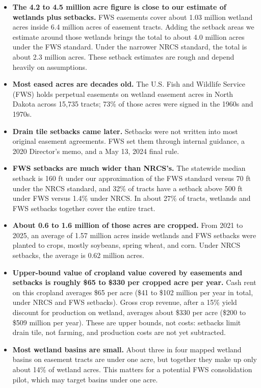 \documentclass{theme/arpc-memo}
\begin{document}
\begin{itemize}

\item {\textbf{\color{ndsu} The 4.2 to 4.5 million acre figure is close to our estimate of wetlands plus setbacks.}} FWS easements cover about 1.03 million wetland acres inside 6.4 million acres of easement tracts. Adding the setback areas we estimate around those wetlands brings the total to about 4.0 million acres under the FWS standard. Under the narrower NRCS standard, the total is about 2.3 million acres. These setback estimates are rough and depend heavily on assumptions.

\item {\textbf{\color{ndsu} Most eased acres are decades old.}} The U.S. Fish and Wildlife Service (FWS) holds perpetual easements on wetland easement acres in North Dakota across 15,735 tracts; 73\% of those acres were signed in the 1960s and 1970s.

\item {\textbf{\color{ndsu} Drain tile setbacks came later.}} Setbacks were not written into most original easement agreements. FWS set them through internal guidance, a 2020 Director's memo, and a May 13, 2024 final rule.

\item {\textbf{\color{ndsu} FWS setbacks are much wider than NRCS's.}} The statewide median setback is 160 ft under our approximation of the FWS standard versus 70 ft under the NRCS standard, and 32\% of tracts have a setback above 500 ft under FWS versus 1.4\% under NRCS. In about 27\% of tracts, wetlands and FWS setbacks together cover the entire tract.

\item {\textbf{\color{ndsu} About 0.6 to 1.6 million of those acres are cropped.}} From 2021 to 2025, an average of 1.57 million acres inside wetlands and FWS setbacks were planted to crops, mostly soybeans, spring wheat, and corn. Under NRCS setbacks, the average is 0.62 million acres.

\item {\textbf{\color{ndsu} Upper-bound value of cropland value covered by easements and setbacks is roughly \$65 to \$330 per cropped acre per year.}} Cash rent on this cropland averages \$65 per acre (\$41 to \$102 million per year in total, under NRCS and FWS setbacks). Gross crop revenue, after a 15\% yield discount for production on wetland, averages about \$330 per acre (\$200 to \$509 million per year). These are upper bounds, not costs: setbacks limit drain tile, not farming, and production costs are not yet subtracted.

\item {\textbf{\color{ndsu} Most wetland basins are small.}} About three in four mapped wetland basins on easement tracts are under one acre, but together they make up only about 14\% of wetland acres. This matters for a potential FWS consolidation pilot, which may target basins under one acre.

\end{itemize}
\end{document}
